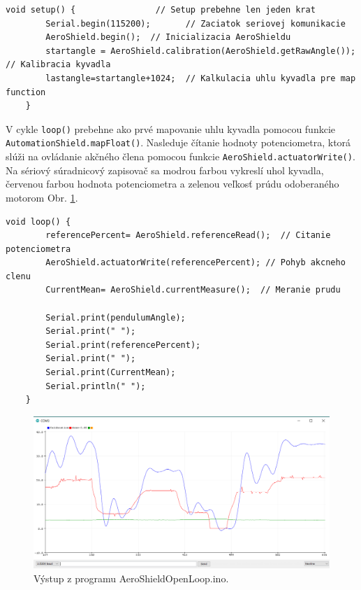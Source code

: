 \begin{lstlisting}[caption={AeroShield open loop setup().},captionpos=b]
	void setup() {                // Setup prebehne len jeden krat 
		Serial.begin(115200);       // Zaciatok seriovej komunikacie 
		AeroShield.begin();  // Inicializacia AeroShieldu 
		startangle = AeroShield.calibration(AeroShield.getRawAngle());   // Kalibracia kyvadla
		lastangle=startangle+1024;  // Kalkulacia uhlu kyvadla pre map function
	}
\end{lstlisting}

V cykle \verb|loop()| prebehne ako prvé mapovanie uhlu kyvadla pomocou funkcie \newline\verb|AutomationShield.mapFloat()|. Nasleduje čítanie hodnoty potenciometra, ktorá slúži na ovládanie akčného člena pomocou funkcie \verb|AeroShield.actuatorWrite()|. Na sériový súradnicový zapisovač sa modrou farbou vykreslí uhol kyvadla, červenou farbou hodnota potenciometra a zelenou veľkosť prúdu odoberaného motorom Obr. \ref{OBRAZOK 3.1}. 

\begin{lstlisting}[caption={AeroShield open loop loop().},captionpos=b]
	void loop() {
		referencePercent= AeroShield.referenceRead();  // Citanie potenciometra
		AeroShield.actuatorWrite(referencePercent); // Pohyb akcneho clenu
		CurrentMean= AeroShield.currentMeasure();  // Meranie prudu
		
		Serial.print(pendulumAngle);    
		Serial.print(" ");
		Serial.print(referencePercent);  
		Serial.print(" ");
		Serial.print(CurrentMean);   
		Serial.println(" ");
	}
\end{lstlisting}

\begin{figure}[!tbh]
	\centering
	\includegraphics[width=120mm]{obr/VystupOLIDE.png}
	\caption{Výstup z programu AeroShieldOpenLoop.ino.}\label{OBRAZOK 3.1}
\end{figure}

